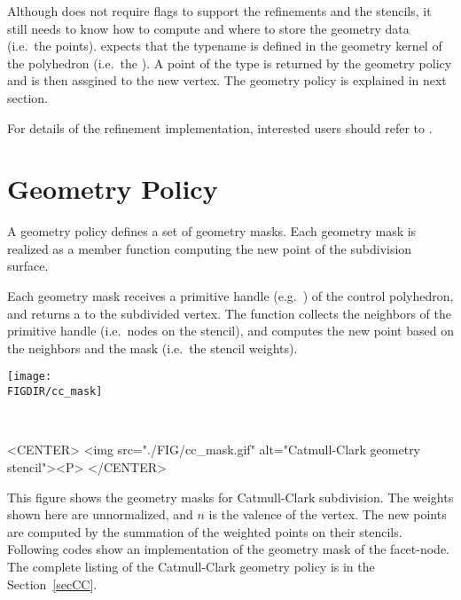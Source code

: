Although  does not require flags
to support the refinements and the stencils, it
still needs to know how to compute and where to store the geometry
data (i.e.~the points).  
expects that the typename  is 
defined in the geometry kernel of the polyhedron
(i.e.~the ). 
A point of the type  is returned by the geometry 
policy and is then assgined to the new vertex.  
The geometry policy is explained in next section. 

For details of the refinement implementation, 
interested users should refer to \cite{cgal:sp-mrbee-05}.

\section{Geometry Policy}
A geometry policy defines a set of geometry masks. 
Each geometry mask is realized as a member function
computing the new point of the subdivision surface. 

Each geometry mask receives a primitive handle 
(e.g.~) of the control polyhedron, 
and returns a  to the subdivided vertex. 
The function collects the neighbors of the primitive handle 
(i.e.~nodes on the stencil), and computes the new point 
based on the neighbors and the mask (i.e.~the stencil weights).

\begin{ccTexOnly}
  \begin{center}
    \parbox{0.4\textwidth}{%
      \texttt{[image: \\FIGDIR/cc\_mask]}%
    } \\ \vspace{0.5cm}
  \end{center}
\end{ccTexOnly}
\begin{ccHtmlOnly}
  <CENTER>
     <img src="./FIG/cc_mask.gif" alt="Catmull-Clark geometry stencil"><P>
  </CENTER>
\end{ccHtmlOnly}

This figure shows the geometry masks for
Catmull-Clark subdivision. The weights shown here are unnormalized, 
and $n$ is the valence of the vertex. The new points are 
computed by the summation of the weighted points on their stencils.
Following codes show an implementation of the geometry mask of 
the facet-node. The complete listing
of the Catmull-Clark geometry policy is in the Section~\ref{secCC}.

